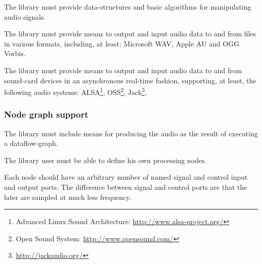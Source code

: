 \begin{requirement}
  \label{req:iter1-begin}
  The library must provide data-structures and basic algorithms for
  manipulating audio signals.
\end{requirement}

\begin{requirement}
  The library must provide means to output and input audio data to and
  from files in various formats, including, at least: Microsoft WAV,
  Apple AU and OGG Vorbis.
\end{requirement}

\begin{requirement}
  \label{req:soundsys}
  \label{req:iter1-end}
  The library must provide means to output and input audio data to and
  from sound-card devices in an asynchronous real-time fashion,
  supporting, at least, the following audio systems:
  ALSA\footnote{Advanced Linux Sound Architecture:
    \url{http://www.alsa-project.org/}}, OSS\footnote{Open Sound
    System: \url{http://www.opensound.com/}}, Jack\footnote{\url{http://jackaudio.org/}}.
\end{requirement}

\subsubsection{Node graph support}

\begin{requirement}
  \label{req:iter2-begin}
  The library must include means for producing the audio as the result of
  executing a dataflow-graph. 
\end{requirement}

\begin{requirement}
  The library user must be able to define his own processing nodes.
\end{requirement}

\begin{requirement}
  \label{req:porttype}
  Each node should have an arbitrary number of named signal and
  control input and output ports. The difference between signal and
  control ports are that the later are sampled at much less frequency.
\end{requirement}



